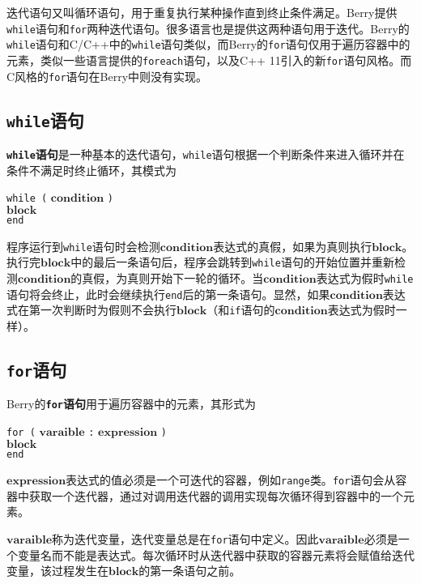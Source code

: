 迭代语句又叫循环语句，用于重复执行某种操作直到终止条件满足。Berry提供\texttt{while}语句和\texttt{for}两种迭代语句。很多语言也是提供这两种语句用于迭代。Berry的\texttt{while}语句和C/C++中的\texttt{while}语句类似，而Berry的\texttt{for}语句仅用于遍历容器中的元素，类似一些语言提供的\texttt{foreach}语句，以及C++ 11引入的新\texttt{for}语句风格。而C风格的\texttt{for}语句在Berry中则没有实现。

\subsection{\texttt{while}语句}

\textbf{\texttt{while}语句}是一种基本的迭代语句，\texttt{while}语句根据一个判断条件来进入循环并在条件不满足时终止循环，其模式为
\begin{algorithm}
    \texttt{while (} $\bm{condition}$ \texttt{)} \\
        \qquad $\bm{block}$ \\
    \texttt{end}
\end{algorithm}

程序运行到\texttt{while}语句时会检测$\bm{condition}$表达式的真假，如果为真则执行$\bm{block}$。执行完$\bm{block}$中的最后一条语句后，程序会跳转到\texttt{while}语句的开始位置并重新检测$\bm{condition}$的真假，为真则开始下一轮的循环。当$\bm{condition}$表达式为假时\texttt{while}语句将会终止，此时会继续执行\texttt{end}后的第一条语句。显然，如果$\bm{condition}$表达式在第一次判断时为假则不会执行$\bm{block}$（和\texttt{if}语句的$\bm{condition}$表达式为假时一样）。

\subsection{\texttt{for}语句}

Berry的\textbf{\texttt{for}语句}用于遍历容器中的元素，其形式为
\begin{algorithm}
    \texttt{for (} $\bm{varaible}$ \texttt{:} $\bm{expression}$ \texttt{)} \\
        \qquad $\bm{block}$ \\
    \texttt{end}
\end{algorithm}

$\bm{expression}$表达式的值必须是一个可迭代的容器，例如\texttt{range}类。\texttt{for}语句会从容器中获取一个迭代器，通过对调用迭代器的调用实现每次循环得到容器中的一个元素。

$\bm{varaible}$称为迭代变量，迭代变量总是在\texttt{for}语句中定义。因此$\bm{varaible}$必须是一个变量名而不能是表达式。每次循环时从迭代器中获取的容器元素将会赋值给迭代变量，该过程发生在$\bm{block}$的第一条语句之前。

